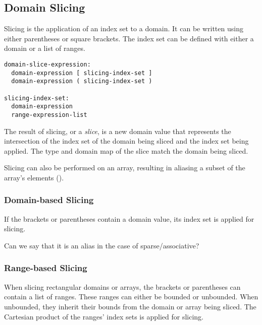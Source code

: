 \subsection{Domain Slicing}
\label{Domain_Slicing}

Slicing is the application of an index set to a domain.
It can be written using either parentheses or square brackets.
The index set can be defined with either a domain or a list of ranges.

\begin{syntax}
\begin{verbatim}
domain-slice-expression:
  domain-expression [ slicing-index-set ]
  domain-expression ( slicing-index-set )

slicing-index-set:
  domain-expression
  range-expression-list
\end{verbatim}
\end{syntax}

The result of slicing, or a \emph{slice}, is a new domain value
that represents the intersection of
the index set of the domain being sliced and
the index set being applied.
The type and domain map of the slice match the domain being sliced.

Slicing can also be performed on an array,
resulting in aliasing a subset of the array's elements
().

\subsubsection{Domain-based Slicing}

If the brackets or parentheses contain a domain value,
its index set is applied for slicing.

\begin{openissue}
Can we say that it is an alias in the case of sparse/associative?
\end{openissue}

\subsubsection{Range-based Slicing}
\label{Range_Based_Slicing}
When slicing rectangular domains or arrays, the brackets or parentheses
can contain a list of  ranges.  These ranges can either be bounded
or unbounded.
%
When unbounded, they inherit their bounds from the
domain or array being sliced.
%
The Cartesian product of the ranges' index sets is applied for slicing.

